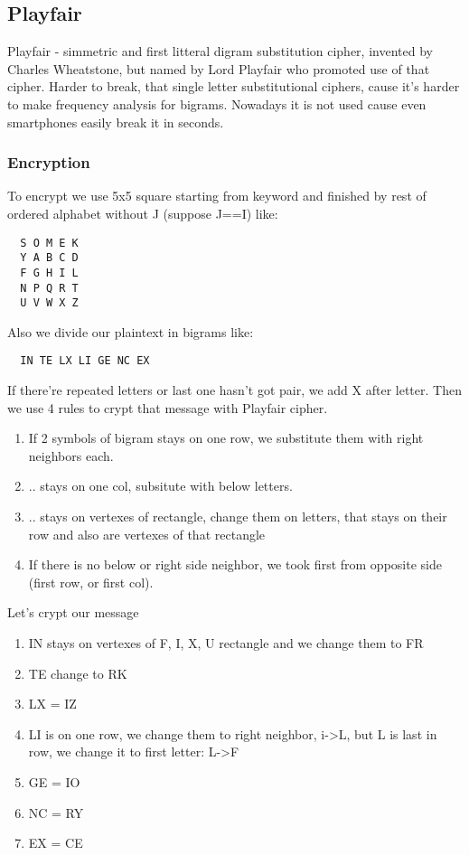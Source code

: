 \documentclass[10pt]{article}
\begin{document}
  \subsection{Playfair}
  Playfair - simmetric and first litteral digram substitution cipher, invented by Charles Wheatstone, but named by Lord Playfair who promoted use of that cipher. Harder to break, that single letter substitutional ciphers, cause it's harder to make frequency analysis for bigrams. Nowadays it is not used cause even smartphones easily break it in seconds.

  \subsubsection{Encryption}
  To encrypt we use 5x5 square starting from keyword and finished by rest of ordered alphabet without J (suppose J==I) like:
  \begin{verbatim}  
  S O M E K
  Y A B C D
  F G H I L
  N P Q R T
  U V W X Z
  \end{verbatim}
  Also we divide our plaintext in bigrams like:
  \begin{verbatim}
  IN TE LX LI GE NC EX
  \end{verbatim}
  If there're repeated letters or last one hasn't got pair, we add X after letter.
  Then we use 4 rules to crypt that message with Playfair cipher.
  \begin{enumerate}
  	\item If 2 symbols of bigram stays on one row, we substitute them with right neighbors each.
  	\item .. stays on one col, subsitute with below letters.
  	\item .. stays on vertexes of rectangle, change them on letters, that stays on their row and also are vertexes of that rectangle
  	\item If there is no below or right side neighbor, we took first from opposite side (first row, or first col). 
  \end{enumerate}

  Let's crypt our message
  \begin{enumerate}
  	\item IN stays on vertexes of {F, I, X, U} rectangle and we change them to FR
  	\item TE change to RK
  	\item LX = IZ
  	\item LI is on one row, we change them to right neighbor, i->L, but L is last in row, we change it to first letter: L->F
  	\item GE = IO
  	\item NC = RY
  	\item EX = CE
  \end{enumerate}
\end{document}
